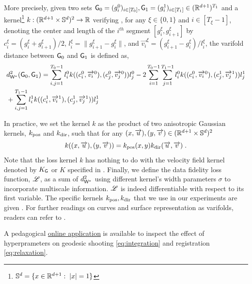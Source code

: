 More precisely, given two sets $\mathsf{G}_0=(g_i^0)_{i\in[T_0]},\mathsf{G}_1=(g_i^1)_{i\in[T_1]}\in (\mathbb{R}^{d+1})^{T_1}$ and a kernel\footnote{$\mathbb{S}^d=\{x\in\mathbb{R}^{d+1}:\; |x|=1\}$} $k:(\mathbb{R}^{d+1} \times \mathbb{S}^d)^2\to \mathbb{R}$
verifying \citep[Proposition 2 \& 4]{kaltenmark2017general}, for any $\xi\in\{0,1\}$ and $i\in[T_\xi-1]$, denoting the center and length of the $i^{th}$ segment $[g_i^\xi,g_{i+1}^\xi]$ by
$c_i^\xi = (g_i^\xi + g_{i+1}^\xi)/2$, $l_i^\xi = \| g_{i+1}^\xi-g_{i}^\xi\|$, and 
$\overrightarrow{v_i}^\xi = (g_{i+1}^\xi-g_{i}^\xi)/l_i^\xi$, the varifold distance between $\mathsf{G}_0$ and $\mathsf{G}_1$  is defined as,
\begin{align}
  &d_{\mathsf{W}^*}^2(\mathsf{G}_0,\mathsf{G}_1) = \sum_{i,j = 1}^{T_0-1}l^0_i k((c^0_i,\overrightarrow{v_i}^0),(c^0_j,\overrightarrow{v_j}^0))l^0_j
  - 2 \sum_{i=1}^{T_0-1}\sum_{j=1}^{T_1-1}l^0_i k((c^0_i,\overrightarrow{v_i}^0),(c^1_j,\overrightarrow{v_j}^1))l^1_j \\
  &+ \sum_{i,j = 1}^{T_1-1}l^1_i k((c^1_i,\overrightarrow{v_i}^1),(c^1_j,\overrightarrow{v_j}^1))l^1_j 
\end{align}

In practice, we set the kernel $k$ as the product of two anisotropic Gaussian kernels, $k_{\mathrm{pos}}$ and $k_{\mathrm{dir}}$, 
such that for any $(x,\overrightarrow{u}),(y,\overrightarrow{v}) \in (\mathbb{R}^{d+1} \times \mathbb{S}^d)^2$
\begin{equation}
 k((x,\overrightarrow{u}),(y,\overrightarrow{v})) = k_{\mathrm{pos}}(x,y)k_{\mathrm{dir}}(\overrightarrow{u},\overrightarrow{v}) \;.
 \end{equation}
 Note that the loss kernel $k$ has nothing to do with the velocity field kernel denoted by $K_{\mathsf{G}}$ or $K$ specified in .
Finally, we define the data fidelity loss function, $\mathscr{L}$, as a sum of $ d_{\mathsf{W}^*}^2$ using different kernel's width parameters $\sigma$ to incorporate multiscale information. $\mathscr{L}$ is indeed differentiable with respect to its first variable.
The specific kernels $k_{\mathrm{pos}},k_{\mathrm{dir}}$ that we use in our experiments are given .
For further readings on curves and surface representation as varifolds, readers can refer to \cite{kaltenmark2017general,charon2013varifold}. 

A pedagogical \href{https://tslddmmapp.streamlit.app}{\underline{online application}} is available to inspect the effect of hyperprameters on geodesic shooting \eqref{eq:integration} and registration \eqref{eq:relaxation}.
 




